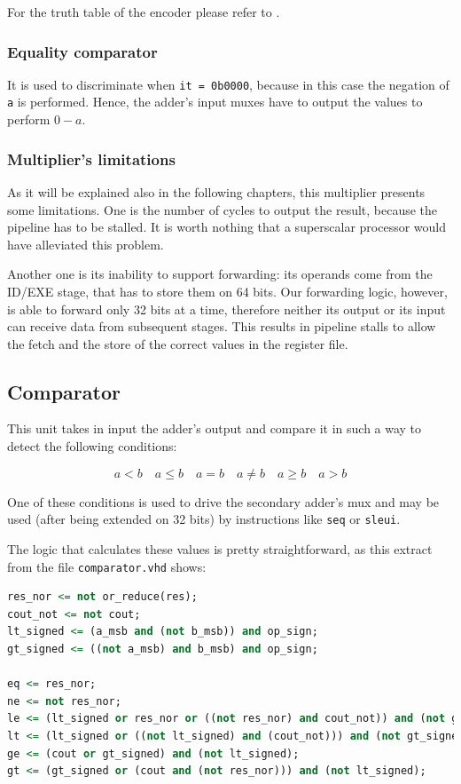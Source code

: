 For the truth table of the encoder please refer to \cite{ln}.

\subsubsection{Equality comparator}

It is used to discriminate when \verb|it = 0b0000|, because in this case the negation of \verb|a| is performed. Hence, the adder's input muxes have to output the values to perform $0-a$.

\subsubsection{Multiplier's limitations}

As it will be explained also in the following chapters, this multiplier presents some limitations. One is the number of cycles to output the result, because the pipeline has to be stalled. It is worth nothing that
a superscalar processor would have alleviated this problem.

Another one is its inability to support forwarding: its operands come from the ID/EXE stage, that has to store them on 64 bits. Our forwarding logic, however, is able to forward only 32 bits at a time, therefore
neither its output or its input can receive data from subsequent stages. This results in pipeline stalls to allow the fetch and the store of the correct values in the register file.

\subsection{Comparator}

This unit takes in input the adder's output and compare it in such a way to detect the following conditions:

$$a < b \quad a \leq b \quad a = b \quad a \neq b \quad a \geq b \quad a > b$$

One of these conditions is used to drive the secondary adder's mux and may be used (after being extended on 32 bits) by instructions like \verb|seq| or \verb|sleui|.

The logic that calculates these values is pretty straightforward, as this extract from the file \verb|comparator.vhd| shows:

\begin{lstlisting}[language=vhdl]
res_nor <= not or_reduce(res);
cout_not <= not cout;
lt_signed <= (a_msb and (not b_msb)) and op_sign;
gt_signed <= ((not a_msb) and b_msb) and op_sign;

eq <= res_nor;
ne <= not res_nor;
le <= (lt_signed or res_nor or ((not res_nor) and cout_not)) and (not gt_signed);
lt <= (lt_signed or ((not lt_signed) and (cout_not))) and (not gt_signed);
ge <= (cout or gt_signed) and (not lt_signed); 
gt <= (gt_signed or (cout and (not res_nor))) and (not lt_signed);
\end{lstlisting}

